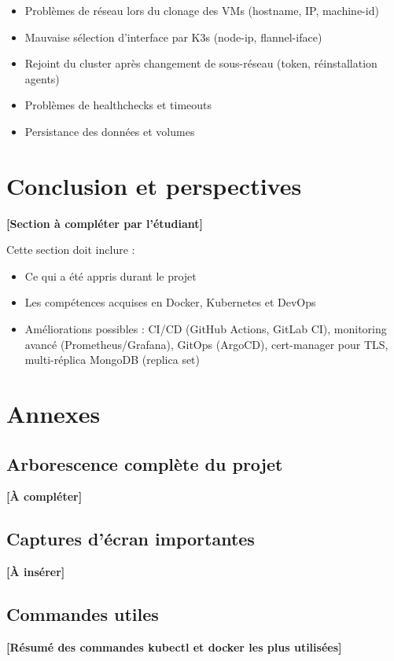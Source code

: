 \documentclass[12pt,a4paper]{report}
\begin{document}
\begin{itemize}
\item Problèmes de réseau lors du clonage des VMs (hostname, IP, machine-id)
\item Mauvaise sélection d'interface par K3s (node-ip, flannel-iface)
\item Rejoint du cluster après changement de sous-réseau (token, réinstallation agents)
\item Problèmes de healthchecks et timeouts
\item Persistance des données et volumes
\end{itemize}

\chapter{Conclusion et perspectives}
\textbf{[Section à compléter par l'étudiant]}

Cette section doit inclure :

\begin{itemize}
\item Ce qui a été appris durant le projet
\item Les compétences acquises en Docker, Kubernetes et DevOps
\item Améliorations possibles : CI/CD (GitHub Actions, GitLab CI), monitoring avancé (Prometheus/Grafana), GitOps (ArgoCD), cert-manager pour TLS, multi-réplica MongoDB (replica set)
\end{itemize}

\chapter*{Annexes}

\section*{Arborescence complète du projet}
\textbf{[À compléter]}

\section*{Captures d'écran importantes}
\textbf{[À insérer]}

\section*{Commandes utiles}
\textbf{[Résumé des commandes kubectl et docker les plus utilisées]}
\end{document}
